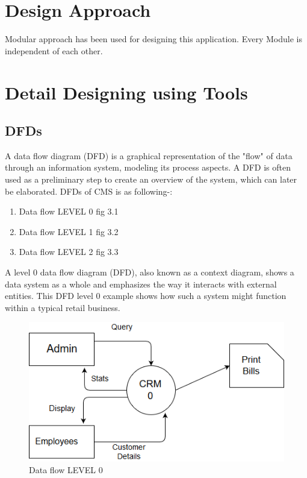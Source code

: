 \section{Design Approach}
Modular approach has been used for designing this application. Every Module is independent of each other.

\section{Detail Designing using Tools}

\subsection{DFDs}
A data flow diagram (DFD) is a graphical representation of the "flow" of data through an information system, modeling its process aspects. A DFD is often used as a preliminary step to create an overview of the system, which can later be elaborated. DFDs of CMS is as following-:
\begin{enumerate}
\item Data flow LEVEL 0 fig 3.1
\item Data flow LEVEL 1 fig 3.2
\item Data flow LEVEL 2 fig 3.3
\end{enumerate}

A level 0 data flow diagram (DFD), also known as a context diagram, shows a data system as a whole and emphasizes the way it interacts with external entities. This DFD level 0 example shows how such a system might function within a typical retail business.

\begin{figure}[h!]
\centering \includegraphics[scale=0.55]{input/images/dfdlevel0.png}
\caption{Data flow LEVEL 0}
\label{fig:DFDs}
\end{figure}

